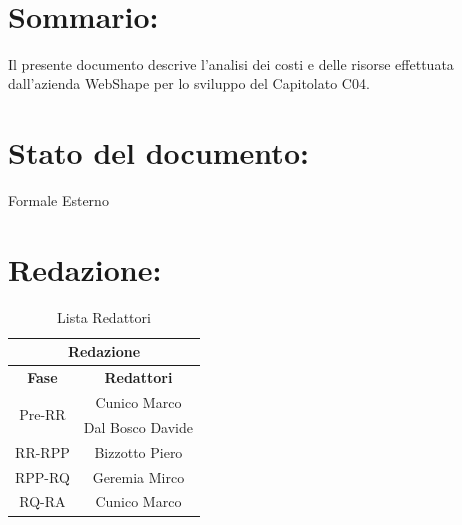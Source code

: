 \begin{center} %
	\begin{Huge}	
				\textbf{\TITOLODOC}
			\\
	\end{Huge}
\end{center}

\section*{\LARGE Sommario:}
Il presente documento descrive l'analisi dei costi e delle risorse effettuata dall'azienda WebShape per lo sviluppo del Capitolato C04.

\indent \indent

\section*{\LARGE Stato del documento:}
\indent \indent
	Formale Esterno

\section*{\LARGE Redazione:}
	\begin{table}[!h]
		\begin{center}
			\begin{tabular}
				{|c|c|}
				\hline
				\multicolumn{2}{|c|}{ \textbf{Redazione} } \\
				\hline
				\textbf{Fase} & \textbf{Redattori} \\
				\hline
				\multirow{2}{*}{Pre-RR} & Cunico Marco\\
										& Dal Bosco Davide\\
				\hline
				RR-RPP & Bizzotto Piero\\
				\hline
				RPP-RQ & Geremia Mirco\\
				\hline
				RQ-RA & Cunico Marco \\
				\hline
			\end{tabular}
			\caption{Lista Redattori} %
			\label{tabredazione}
		\end{center}
	\end{table}
	
